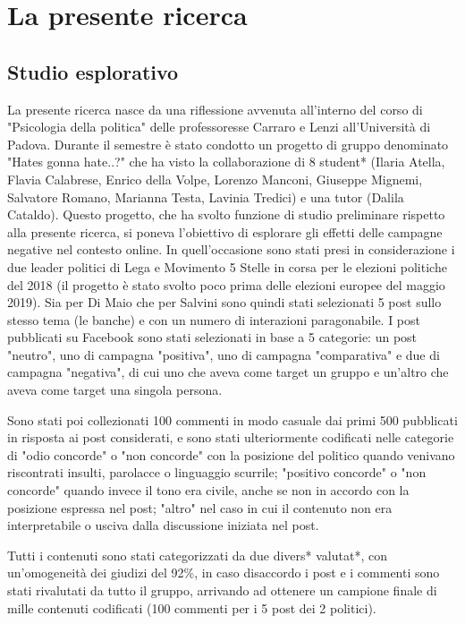 
\chapter{La presente ricerca}
\label{chap:ricerca}

\section{Studio esplorativo}
La presente ricerca nasce da una riflessione avvenuta all'interno del corso di "Psicologia della politica" delle professoresse Carraro e Lenzi all’Università di Padova. Durante il semestre è stato condotto un progetto di gruppo denominato "Hates gonna hate..?" che ha visto la collaborazione di 8 student* (Ilaria Atella, Flavia Calabrese, Enrico della Volpe, Lorenzo Manconi, Giuseppe Mignemi, Salvatore Romano, Marianna Testa, Lavinia Tredici) e una tutor (Dalila Cataldo). Questo progetto, che ha svolto funzione di studio preliminare rispetto alla presente ricerca, si poneva l'obiettivo di esplorare gli effetti delle campagne negative nel contesto online. In quell'occasione sono stati presi in considerazione i due leader politici di Lega e Movimento 5 Stelle in corsa per le elezioni politiche del 2018 (il progetto è stato svolto poco prima delle elezioni europee del maggio 2019). Sia per Di Maio che per Salvini sono quindi stati selezionati 5 post sullo stesso tema (le banche) e con un numero di interazioni paragonabile. I post pubblicati su Facebook sono stati selezionati in base a 5 categorie: un post "neutro", uno di campagna "positiva", uno di campagna "comparativa" e due di campagna "negativa", di cui uno che aveva come  target un gruppo e un'altro che aveva come  target una singola persona.

Sono stati poi collezionati 100 commenti in modo casuale dai primi 500 pubblicati in risposta ai post considerati, e sono stati ulteriormente codificati nelle categorie di "odio concorde" o "non concorde" con la posizione del politico quando venivano riscontrati insulti, parolacce o linguaggio scurrile; "positivo concorde" o "non concorde" quando invece il tono era civile, anche se non in accordo con la posizione espressa nel post; "altro" nel caso in cui il contenuto non era interpretabile o usciva dalla discussione iniziata nel post.

Tutti i contenuti sono stati categorizzati da due divers* valutat*, con un'omogeneità dei giudizi del 92\%, in caso disaccordo i post e i commenti sono stati rivalutati da tutto il gruppo, arrivando ad ottenere un campione finale di mille contenuti codificati (100 commenti per i 5 post dei 2 politici).


